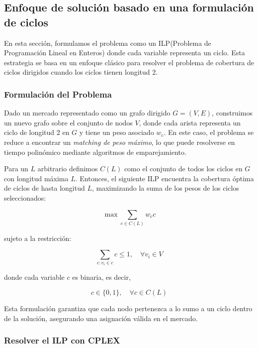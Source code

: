 \documentclass[twocolumn, fontsize=10pt]{article}
\theoremstyle{definition} %
\begin{document}
\subsection{Enfoque de solución basado en una formulación de ciclos}

En esta sección, formulamos el problema como un ILP(Problema de Programación Lineal en Enteros) donde cada variable representa un ciclo. Esta estrategia se basa en un enfoque clásico para resolver el problema de cobertura de ciclos dirigidos cuando los ciclos tienen longitud 2.

\subsubsection{Formulación del Problema}

Dado un mercado representado como un grafo dirigido \( G = (V, E) \), construimos un nuevo grafo sobre el conjunto de nodos \( V \), donde cada arista representa un ciclo de longitud 2 en \( G \) y tiene un peso asociado \( w_c \). En este caso, el problema se reduce a encontrar un \textit{matching de peso máximo}, lo que puede resolverse en tiempo polinómico mediante algoritmos de emparejamiento.

Para un \( L \) arbitrario definimos \( C(L) \) como el conjunto de todos los ciclos en \( G \) con longitud máxima \( L \). Entonces, el siguiente ILP encuentra la cobertura óptima de ciclos de hasta longitud \( L \), maximizando la suma de los pesos de los ciclos seleccionados:

\begin{equation}
\max \sum_{c \in C(L)} w_c c
\end{equation}

sujeto a la restricción:

\begin{equation}
\sum_{c: v_i \in c} c \leq 1, \quad \forall v_i \in V
\end{equation}

donde cada variable \( c \) es binaria, es decir,

\begin{equation}
c \in \{0,1\}, \quad \forall c \in C(L)
\end{equation}

Esta formulación garantiza que cada nodo pertenezca a lo sumo a un ciclo dentro de la solución, asegurando una asignación válida en el mercado.

\subsubsection{Resolver el ILP con CPLEX}
\end{document}

